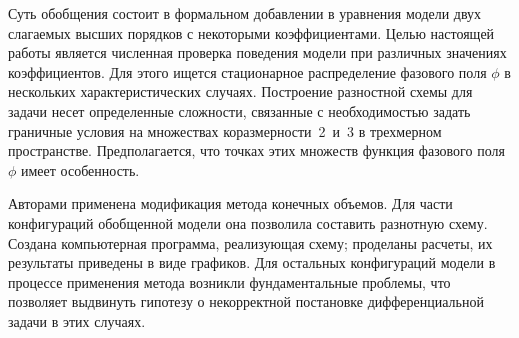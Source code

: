Суть обобщения состоит в формальном добавлении в уравнения модели двух слагаемых высших порядков с некоторыми коэффициентами. Целью настоящей работы является численная проверка поведения модели при различных значениях коэффициентов. Для этого ищется стационарное распределение фазового поля $\phi$ в нескольких характеристических случаях. Построение разностной схемы для задачи несет определенные сложности, связанные с необходимостью задать граничные условия на множествах коразмерности~2~и~3 в трехмерном пространстве. Предполагается, что точках этих множеств функция фазового поля $\phi$ имеет особенность.

Авторами применена модификация метода конечных объемов. Для части конфигураций обобщенной модели она позволила составить разнотную схему. Создана компьютерная программа, реализующая схему; проделаны расчеты, их результаты приведены в виде графиков. Для остальных конфигураций модели в процессе применения метода возникли фундаментальные проблемы, что позволяет выдвинуть гипотезу о некорректной постановке дифференциальной задачи в этих случаях.